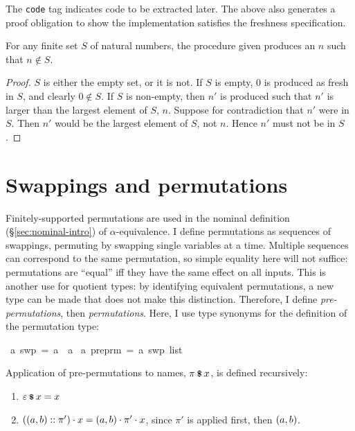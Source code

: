 The \texttt{code} tag indicates code to be extracted later.
The above also generates a proof obligation to show the implementation satisfies the freshness specification.

\begin{lemma}
For any finite set \(S\) of natural numbers, the procedure given produces an \(n\) such that \(n \notin S\).
\end{lemma}
\begin{proof}
\(S\) is either the empty set, or it is not.
If \(S\) is empty, 0 is produced as fresh in \(S\), and clearly \(0 \notin S\).
If \(S\) is non-empty, then \(n'\) is produced such that \(n'\) is larger than the largest element of \(S\), \(n\).
Suppose for contradiction that \(n'\) were in \(S\).
Then \(n'\) would be the largest element of \(S\), not \(n\).
Hence \(n'\) must not be in \(S\).
\end{proof}

\section{Swappings and permutations}
\label{sec:permutations}
Finitely-supported permutations are used in the nominal definition (\S\ref{sec:nominal-intro}) of \(\alpha\)-equivalence.
I define permutations as sequences of swappings, permuting by swapping single variables at a time.
Multiple sequences can correspond to the same permutation, so simple equality here will not suffice: permutations are ``equal'' iff they have the same effect on all inputs.
This is another use for quotient types: by identifying equivalent permutations, a new type can be made that does not make this distinction.
Therefore, I define \emph{pre-permutations}, then \emph{permutations}.
Here, I use type synonyms for the definition of the permutation type:

\begin{implementation}
\isamarkupfalse%
\ {\isacharprime}a\ swp\ =\ {\isachardoublequoteopen}{\isacharprime}a\ {\isasymtimes}\ {\isacharprime}a{\isachardoublequoteclose}\isanewline
{}\isamarkupfalse%
\ {\isacharprime}a\ preprm\ =\ {\isachardoublequoteopen}{\isacharprime}a\ swp\ list{\isachardoublequoteclose}
\end{implementation}

\begin{definition}
Application of pre-permutations to names, \(\pi \mathbin{\textrm{\footnotesize{\textbf{\$}}}} x\), is defined recursively:
\begin{enumerate}
\item
\(\varepsilon \mathbin{\textrm{\footnotesize{\textbf{\$}}}} x = x\)
\item
\(\left(\left(a, b\right) :: \pi'\right) \cdot x = \left(a, b\right) \cdot \pi' \cdot x\), since \(\pi'\) is applied first, then \(\left(a, b\right)\).
\end{enumerate}
\end{definition}

